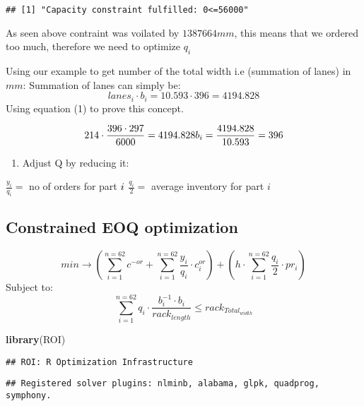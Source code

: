 \documentclass[
]{article}
\newenvironment{Shaded}{\begin{snugshade}}{\end{snugshade}}
\newcommand{\KeywordTok}[1]{\textcolor[rgb]{0.13,0.29,0.53}{\textbf{#1}}}
\newcommand{\NormalTok}[1]{#1}
\providecommand{\tightlist}{%
  \setlength{\itemsep}{0pt}\setlength{\parskip}{0pt}}
\begin{document}
\begin{verbatim}
## [1] "Capacity constraint fulfilled: 0<=56000"
\end{verbatim}

As seen above contraint was voilated by \(1387664 mm\), this means that
we ordered too much, therefore we need to optimize \(q_i\)

Using our example to get number of the total width i.e (summation of
lanes) in \(mm\): Summation of lanes can simply be:
\[lanes_i \cdot b_i= 10.593 \cdot 396=4194.828\] Using equation (1) to
prove this concept.

\[214 \cdot \frac {396 \cdot 297}{6000}=4194.828 \\ b_i= \frac {4194.828}{10.593}=396\]

\begin{enumerate}
\def\labelenumi{(\Alph{enumi})}
\setcounter{enumi}{3}
\tightlist
\item
  Adjust Q by reducing it:
\end{enumerate}

\(\frac {y_i}{q_i}=\) no of orders for part \(i \\\) \(\frac {q_i}{2}=\)
average inventory for part \(i\)

\hypertarget{constrained-eoq-optimization}{%
\subsection{Constrained EOQ
optimization}\label{constrained-eoq-optimization}}

\[ min \rightarrow (\sum_{i=1}^{n=62}c^{-or} + \sum_{i=1}^{n=62} \frac {y_i}{q_i} \cdot c_i^{or}) + (h \cdot \sum_{i=1}^{n=62} \frac {q_i}{2}\cdot pr_i ) \]
Subject to:
\[\sum_{i=1}^{n=62} q_i \cdot \frac {b_i^{-1} \cdot b_i}{rack_{length}} \le rack_{Total_{width}} \]

\begin{Shaded}
\begin{Highlighting}[]
\KeywordTok{library}\NormalTok{(ROI)}
\end{Highlighting}
\end{Shaded}

\begin{verbatim}
## ROI: R Optimization Infrastructure
\end{verbatim}

\begin{verbatim}
## Registered solver plugins: nlminb, alabama, glpk, quadprog, symphony.
\end{verbatim}
\end{document}
